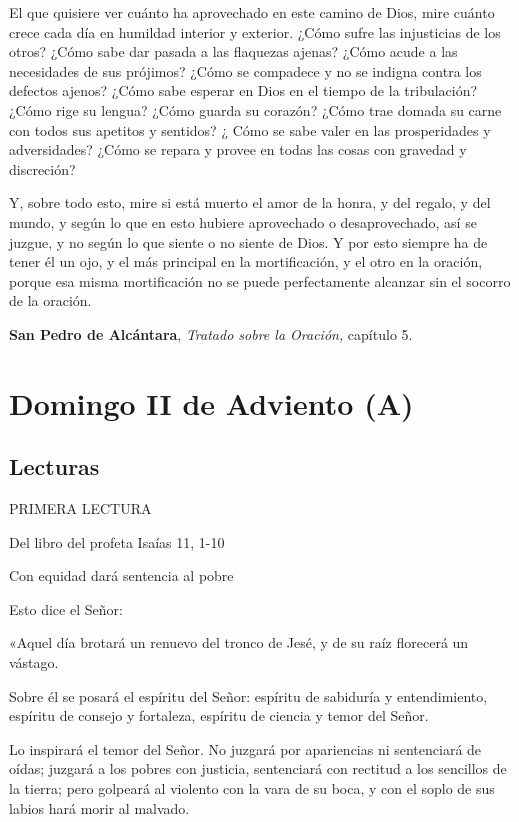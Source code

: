 \begin{body}
El que quisiere ver cuánto ha aprovechado en este camino de Dios, mire cuánto crece cada día en humildad interior y exterior. ¿Cómo sufre las injusticias de los otros? ¿Cómo sabe dar pasada a las flaquezas ajenas? ¿Cómo acude a las necesidades de sus prójimos? ¿Cómo se compadece y no se indigna contra los defectos ajenos? ¿Cómo sabe esperar en Dios en el tiempo de la tribulación? ¿Cómo rige su lengua? ¿Cómo guarda su corazón? ¿Cómo trae domada su carne con todos sus apetitos y sentidos? ¿ Cómo se sabe valer en las prosperidades y adversidades? ¿Cómo se repara y provee en todas las cosas con gravedad y discreción?

Y, sobre todo esto, mire si está muerto el amor de la honra, y del regalo, y del mundo, y según lo que en esto hubiere aprovechado o desaprovechado, así se juzgue, y no según lo que siente o no siente de Dios. Y por esto siempre ha de tener él un ojo, y el más principal en la mortificación, y el otro en la oración, porque esa misma mortificación no se puede perfectamente alcanzar sin el socorro de la oración.

\textbf{San Pedro de Alcántara}, \emph{Tratado sobre la Oración,} capítulo 5.

\chapter{Domingo II de Adviento (A)}

\section{Lecturas}

PRIMERA LECTURA

Del libro del profeta Isaías 11, 1-10

Con equidad dará sentencia al pobre

Esto dice el Señor:

«Aquel día brotará un renuevo del tronco de Jesé, y de su raíz florecerá
un vástago.

Sobre él se posará el espíritu del Señor: espíritu de sabiduría y
entendimiento, espíritu de consejo y fortaleza, espíritu de ciencia y
temor del Señor.

Lo inspirará el temor del Señor. No juzgará por apariencias ni
sentenciará de oídas; juzgará a los pobres con justicia, sentenciará con
rectitud a los sencillos de la tierra; pero golpeará al violento con la
vara de su boca, y con el soplo de sus labios hará morir al malvado.


\end{body}
